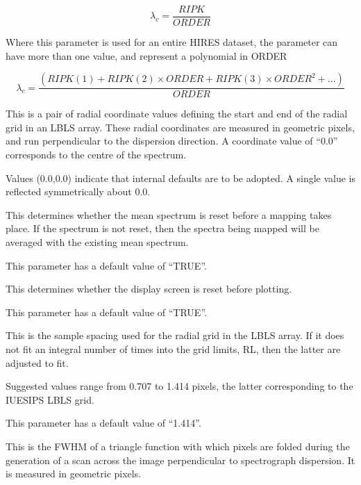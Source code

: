 \begin {description}
\begin {equation}
\lambda_c = \frac {RIPK}{ORDER}
\end {equation}

Where this parameter is used for an entire HIRES dataset, the
parameter can have more than one value, and represent a polynomial
in ORDER

\begin {equation}
\lambda_c 
= \frac {(RIPK(1) + RIPK(2) \times ORDER + RIPK(3) \times ORDER^2 + ...)}
{ORDER}
\end {equation}

\item [RL=(number,number)]
This is a pair of radial coordinate values defining the start and end of
the radial grid in an LBLS array.
These radial coordinates are measured in geometric pixels, and run
perpendicular to the dispersion direction.
A coordinate value of ``0.0'' corresponds to the centre of the spectrum.

Values (0.0,0.0) indicate that internal defaults are to be adopted.
A single value is reflected symmetrically about 0.0.

\item [RM=boolean]
This determines whether the mean spectrum is reset before a mapping
takes place.
If the spectrum is not reset, then the spectra being mapped will be
averaged with the existing mean spectrum.

This parameter has a default value of ``TRUE''.

\item [RS=boolean]
This determines whether the display screen is reset before plotting.

This parameter has a default value of ``TRUE''.

\item [RSAMP=number]
This is the sample spacing used for the radial grid in the LBLS array.
If it does not fit an integral number of times into the grid limits, RL,
then the latter are adjusted to fit.

Suggested values range from 0.707 to 1.414 pixels, the latter
corresponding to the IUESIPS LBLS grid.

This parameter has a default value of ``1.414''.

\item [SCANAV=number]
This is the FWHM of a triangle function with which pixels are folded
during the generation of a scan across the image perpendicular to
spectrograph dispersion.
It is measured in geometric pixels.


\end{description}
